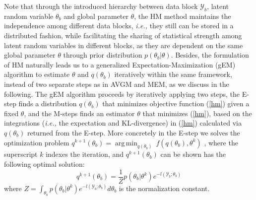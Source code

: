 \documentclass{article}
\DeclareMathOperator*{\argmin}{arg\,min}
\newcommand{\ie}[0]{\emph{i.e., }}
\newcommand{\1}[0]{\ensuremath{\boldsymbol{1}}\xspace}
\begin{document}
Note that through the introduced hierarchy between data block $\mathcal{Y}_b$, latent random variable $\theta_b$ and global parameter $\theta$, the HM method maintains the independence among different data blocks, \ie they still can be stored in a distributed fashion, while facilitating the sharing of statistical strength among latent random variables in different blocks, as they are dependent on the same global parameter $\theta$ through prior distribution $p(\theta_b|\theta)$. Besides, the formulation of HM naturally leads us to a generalized Expectation-Maximization (gEM) algorithm to estimate $\theta$ and $q(\theta_b)$ iteratively within the same framework, instead of two separate steps as in AVGM and MEM, as we discuss in the following.
The gEM algorithm proceeds by iteratively applying two steps, the E-step finds a distribution $q(\theta_b)$ that minimizes objective function (\ref{hm}) given a fixed $\theta$, and the M-steps finds an estimator $\theta$ that minimizes (\ref{hm}), based on the integrations (\ie the expectation and KL-divergence) in (\ref{hm}) calculated via $q(\theta_b)$ returned from the E-step. More concretely in the E-step we solves the optimization problem
$
q^{k+1}(\theta_b) = \argmin_{q(\theta_b)}~ f(q(\theta_b), \theta^k)
$
, where the superscript $k$ indexes the iteration, and $q^{k+1}(\theta_b)$ can be shown has the following optimal solution: 
\begin{equation}\label{hm_e_step_sol}
q^{k+1}(\theta_b) = \frac{1}{Z}p(\theta_b|\theta^k)e^{-l(\mathcal{Y}_b; \theta_b)}
\end{equation}
where $Z = \int_{\theta_b}p(\theta_b|\theta^k)e^{-l(\mathcal{Y}_b; \theta_b)}d\theta_b$ is the normalization constant. 

\end{document}
